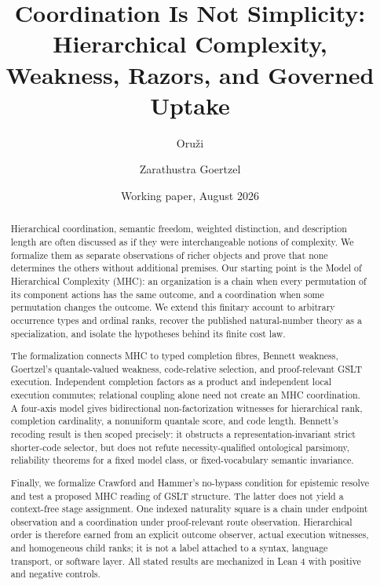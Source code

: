 \documentclass[11pt]{article}
\title{\textbf{Coordination Is Not Simplicity:}\\
Hierarchical Complexity, Weakness, Razors, and Governed Uptake}
\author{Oru\v{z}i \and Zarathustra Goertzel}
\date{Working paper, August 2026}
\theoremstyle{remark}
\begin{document}
\maketitle

\begin{abstract}
Hierarchical coordination, semantic freedom, weighted distinction, and
description length are often discussed as if they were interchangeable notions
of complexity.  We formalize them as separate observations of richer objects
and prove that none determines the others without additional premises.  Our
starting point is the Model of Hierarchical Complexity (MHC): an organization
is a chain when every permutation of its component actions has the same
outcome, and a coordination when some permutation changes the outcome.  We
extend this finitary account to arbitrary occurrence types and ordinal ranks,
recover the published natural-number theory as a specialization, and isolate
the hypotheses behind its finite cost law.

The formalization connects MHC to typed completion fibres, Bennett weakness,
Goertzel's quantale-valued weakness, code-relative selection, and proof-relevant
GSLT execution.  Independent completion factors as a product and independent
local execution commutes; relational coupling alone need not create an MHC
coordination.  A four-axis model gives bidirectional non-factorization witnesses
for hierarchical rank, completion cardinality, a nonuniform quantale score,
and code length.  Bennett's recoding result is then scoped precisely: it
obstructs a representation-invariant strict shorter-code selector, but does not
refute necessity-qualified ontological parsimony, reliability theorems for a
fixed model class, or fixed-vocabulary semantic invariance.

Finally, we formalize Crawford and Hammer's no-bypass condition for epistemic
resolve and test a proposed MHC reading of GSLT structure.  The latter does not
yield a context-free stage assignment.  One indexed naturality square is a
chain under endpoint observation and a coordination under proof-relevant route
observation.  Hierarchical order is therefore earned from an explicit outcome
observer, actual execution witnesses, and homogeneous child ranks; it is not a
label attached to a syntax, language transport, or software layer.  All stated
results are mechanized in Lean 4 with positive and negative controls.
\end{abstract}

\tableofcontents
\end{document}
